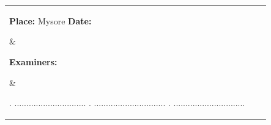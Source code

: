 \documentclass[11pt,a4paper]{report}
\begin{document}
\begin{titlepage}
\hspace{-0.9cm}	%
\begin{tabular*}{\textwidth}{lcr}
\parbox[t]{7cm}{\flushleft \textbf{Place:} Mysore \newline \textbf{Date:}} &
\parbox[t]{3cm}{\flushright \textbf{Examiners:}} &
\parbox[t]{7cm}{. .............................. \newline {}. .............................. \newline {}. .............................. \newline } \\
\end{tabular*}


\end{titlepage}
\end{document}
